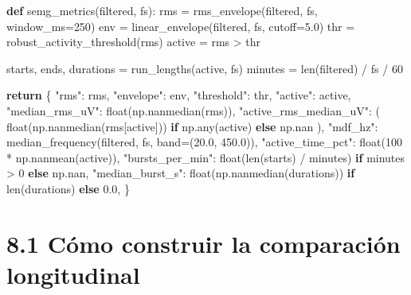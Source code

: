 \documentclass[
  spanish,
  a4paper,
  DIV=11,
  numbers=noendperiod]{scrreprt}
\newenvironment{Shaded}{\begin{snugshade}}{\end{snugshade}}
\newcommand{\BuiltInTok}[1]{\textcolor[rgb]{0.00,0.23,0.31}{#1}}
\newcommand{\ControlFlowTok}[1]{\textcolor[rgb]{0.00,0.23,0.31}{\textbf{#1}}}
\newcommand{\DecValTok}[1]{\textcolor[rgb]{0.68,0.00,0.00}{#1}}
\newcommand{\FloatTok}[1]{\textcolor[rgb]{0.68,0.00,0.00}{#1}}
\newcommand{\KeywordTok}[1]{\textcolor[rgb]{0.00,0.23,0.31}{\textbf{#1}}}
\newcommand{\NormalTok}[1]{\textcolor[rgb]{0.00,0.23,0.31}{#1}}
\newcommand{\OperatorTok}[1]{\textcolor[rgb]{0.37,0.37,0.37}{#1}}
\newcommand{\StringTok}[1]{\textcolor[rgb]{0.13,0.47,0.30}{#1}}
\begin{document}
\begin{Shaded}
\begin{Highlighting}[]
\KeywordTok{def}\NormalTok{ semg\_metrics(filtered, fs):}
\NormalTok{    rms }\OperatorTok{=}\NormalTok{ rms\_envelope(filtered, fs, window\_ms}\OperatorTok{=}\DecValTok{250}\NormalTok{)}
\NormalTok{    env }\OperatorTok{=}\NormalTok{ linear\_envelope(filtered, fs, cutoff}\OperatorTok{=}\FloatTok{5.0}\NormalTok{)}
\NormalTok{    thr }\OperatorTok{=}\NormalTok{ robust\_activity\_threshold(rms)}
\NormalTok{    active }\OperatorTok{=}\NormalTok{ rms }\OperatorTok{\textgreater{}}\NormalTok{ thr}

\NormalTok{    starts, ends, durations }\OperatorTok{=}\NormalTok{ run\_lengths(active, fs)}
\NormalTok{    minutes }\OperatorTok{=} \BuiltInTok{len}\NormalTok{(filtered) }\OperatorTok{/}\NormalTok{ fs }\OperatorTok{/} \DecValTok{60}

    \ControlFlowTok{return}\NormalTok{ \{}
        \StringTok{"rms"}\NormalTok{: rms,}
        \StringTok{"envelope"}\NormalTok{: env,}
        \StringTok{"threshold"}\NormalTok{: thr,}
        \StringTok{"active"}\NormalTok{: active,}
        \StringTok{"median\_rms\_uV"}\NormalTok{: }\BuiltInTok{float}\NormalTok{(np.nanmedian(rms)),}
        \StringTok{"active\_rms\_median\_uV"}\NormalTok{: (}
            \BuiltInTok{float}\NormalTok{(np.nanmedian(rms[active])) }\ControlFlowTok{if}\NormalTok{ np.}\BuiltInTok{any}\NormalTok{(active) }\ControlFlowTok{else}\NormalTok{ np.nan}
\NormalTok{        ),}
        \StringTok{"mdf\_hz"}\NormalTok{: median\_frequency(filtered, fs, band}\OperatorTok{=}\NormalTok{(}\FloatTok{20.0}\NormalTok{, }\FloatTok{450.0}\NormalTok{)),}
        \StringTok{"active\_time\_pct"}\NormalTok{: }\BuiltInTok{float}\NormalTok{(}\DecValTok{100} \OperatorTok{*}\NormalTok{ np.nanmean(active)),}
        \StringTok{"bursts\_per\_min"}\NormalTok{: }\BuiltInTok{float}\NormalTok{(}\BuiltInTok{len}\NormalTok{(starts) }\OperatorTok{/}\NormalTok{ minutes) }\ControlFlowTok{if}\NormalTok{ minutes }\OperatorTok{\textgreater{}} \DecValTok{0} \ControlFlowTok{else}\NormalTok{ np.nan,}
        \StringTok{"median\_burst\_s"}\NormalTok{: }\BuiltInTok{float}\NormalTok{(np.nanmedian(durations)) }\ControlFlowTok{if} \BuiltInTok{len}\NormalTok{(durations) }\ControlFlowTok{else} \FloatTok{0.0}\NormalTok{,}
\NormalTok{    \}}
\end{Highlighting}
\end{Shaded}

\section{8.1 Cómo construir la comparación
longitudinal}\label{cuxf3mo-construir-la-comparaciuxf3n-longitudinal}
\end{document}
